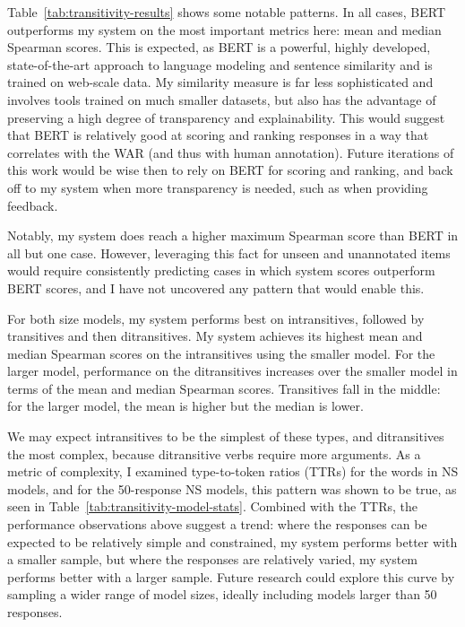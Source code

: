 Table~\ref{tab:transitivity-results} shows some notable patterns. In all cases, BERT outperforms my system on the most important metrics here: mean and median Spearman scores. This is expected, as BERT is a powerful, highly developed, state-of-the-art approach to language modeling and sentence similarity and is trained on web-scale data. My similarity measure is far less sophisticated and involves tools trained on much smaller datasets, but also has the advantage of preserving a high degree of transparency and explainability. This would suggest that BERT is relatively good at scoring and ranking responses in a way that correlates with the WAR (and thus with human annotation). Future iterations of this work would be wise then to rely on BERT for scoring and ranking, and back off to my system when more transparency is needed, such as when providing feedback.

Notably, my system does reach a higher maximum Spearman score than BERT in all but one case. However, leveraging this fact for unseen and unannotated items would require consistently predicting cases in which system scores outperform BERT scores, and I have not uncovered any pattern that would enable this.

For both size models, my system performs best on intransitives, followed by transitives and then ditransitives. My system achieves its highest mean and median Spearman scores on the intransitives using the smaller model. For the larger model, performance on the ditransitives increases over the smaller model in terms of the mean and median Spearman scores. Transitives fall in the middle: for the larger model, the mean is higher but the median is lower.

We may expect intransitives to be the simplest of these types, and ditransitives the most complex, because ditransitive verbs require more arguments. As a metric of complexity, I examined type-to-token ratios (TTRs) for the words in NS models, and for the 50-response NS models, this pattern was shown to be true, as seen in Table~\ref{tab:transitivity-model-stats}. Combined with the TTRs, the performance observations above suggest a trend: where the responses can be expected to be relatively simple and constrained, my system performs better with a smaller sample, but where the responses are relatively varied, my system performs better with a larger sample. Future research could explore this curve by sampling a wider range of model sizes, ideally including models larger than 50 responses.

